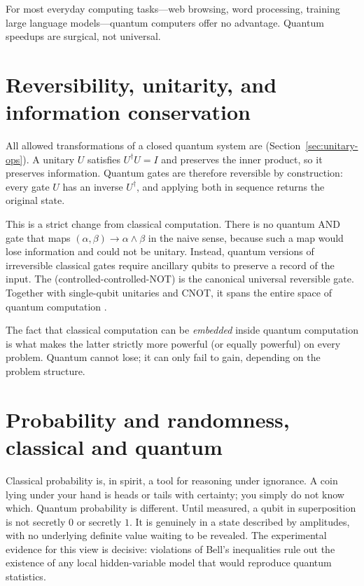 For most everyday computing tasks---web browsing, word processing, training large language models---quantum computers offer no advantage. Quantum speedups are surgical, not universal.

\section{Reversibility, unitarity, and information conservation}

All allowed transformations of a closed quantum system are  (Section~\ref{sec:unitary-ops}). A unitary $U$ satisfies $U^\dagger U = I$ and preserves the inner product, so it preserves information. Quantum gates are therefore reversible by construction: every gate $U$ has an inverse $U^\dagger$, and applying both in sequence returns the original state.

This is a strict change from classical computation. There is no quantum AND gate that maps $(\alpha,\beta)\to\alpha\wedge\beta$ in the naive sense, because such a map would lose information and could not be unitary. Instead, quantum versions of irreversible classical gates require ancillary qubits to preserve a record of the input. The  (controlled-controlled-NOT) is the canonical universal reversible gate. Together with single-qubit unitaries and CNOT, it spans the entire space of quantum computation \citep{barenco_elementary_1995}.

\begin{remark}
The fact that classical computation can be \emph{embedded} inside quantum computation is what makes the latter strictly more powerful (or equally powerful) on every problem. Quantum cannot lose; it can only fail to gain, depending on the problem structure.
\end{remark}

\section{Probability and randomness, classical and quantum}

Classical probability is, in spirit, a tool for reasoning under ignorance. A coin lying under your hand is heads or tails with certainty; you simply do not know which. Quantum probability is different. Until measured, a qubit in superposition is not secretly $0$ or secretly $1$. It is genuinely in a state described by amplitudes, with no underlying definite value waiting to be revealed. The experimental evidence for this view is decisive: violations of Bell's inequalities \citep{bell_einstein_1964,aspect_experimental_1982} rule out the existence of any local hidden-variable model that would reproduce quantum statistics.

